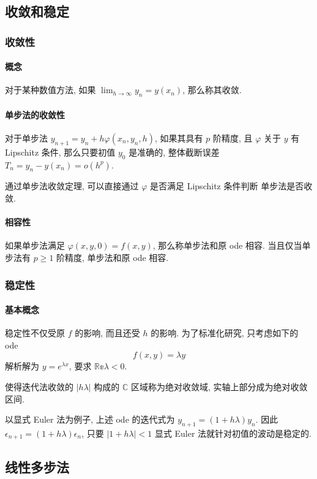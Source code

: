 \documentclass{ctexart}
\newcommand{\Cset}{\mathbb{C}}
\begin{document}
\subsection{收敛和稳定}
\subsubsection{收敛性}
\paragraph{概念}
    对于某种数值方法, 如果 $\lim_{h \to \infty} y_n = y(x_n)$, 那么称其收敛.
\paragraph{单步法的收敛性}
    对于单步法 $y_{n+1} = y_n + h \varphi(x_n, y_n, h)$, 如果其具有 $p$ 阶精度,
    且 $\varphi$ 关于 $y$ 有 Lipschitz 条件, 那么只要初值 $y_0$ 是准确的,
    整体截断误差 $T_{n} = y_n - y(x_n) = o(h^p)$.\par
    通过单步法收敛定理, 可以直接通过 $\varphi$ 是否满足 Lipschitz 条件判断
    单步法是否收敛.
\paragraph{相容性}
    如果单步法满足 $\varphi(x, y, 0) = f(x, y)$, 那么称单步法和原 ode 相容.
    当且仅当单步法有 $p \ge 1$ 阶精度, 单步法和原 ode 相容.
\subsubsection{稳定性}
\paragraph{基本概念}
    稳定性不仅受原 $f$ 的影响, 而且还受 $h$ 的影响. 为了标准化研究, 只考虑如下的 ode \[
        f(x, y) = \lambda y\]
    解析解为 $y = e^{\lambda x}$, 要求 $\mathbb{Re} \lambda < 0$.\par
    使得迭代法收敛的 $|h\lambda|$ 构成的 $\Cset$ 区域称为绝对收敛域, 实轴上部分成为绝对收敛区间.\par
    以显式 Euler 法为例子, 上述 ode 的迭代式为 $y_{n+1} = (1+h\lambda) y_n$.
    因此 $\epsilon_{n+1} = (1 + h\lambda) \epsilon_{n}$, 只要 $|1 + h\lambda| < 1$
    显式 Euler 法就针对初值的波动是稳定的.\par

\subsection{线性多步法}
\end{document}
